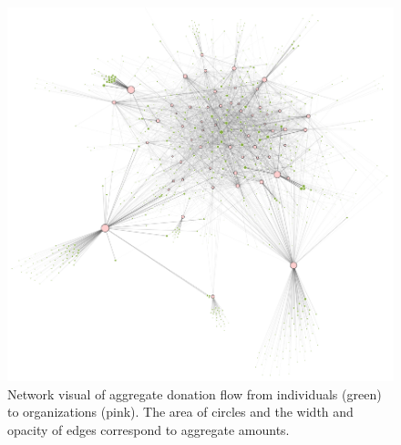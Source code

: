 \begin{figure}[H]
  \centering
  \includegraphics[width=\linewidth]{figures/network}
  \caption{Network visual of aggregate donation flow from individuals (green) to organizations (pink). The area of circles and the width and opacity of edges correspond to aggregate amounts.}
  \label{fig:graph}
\end{figure}
